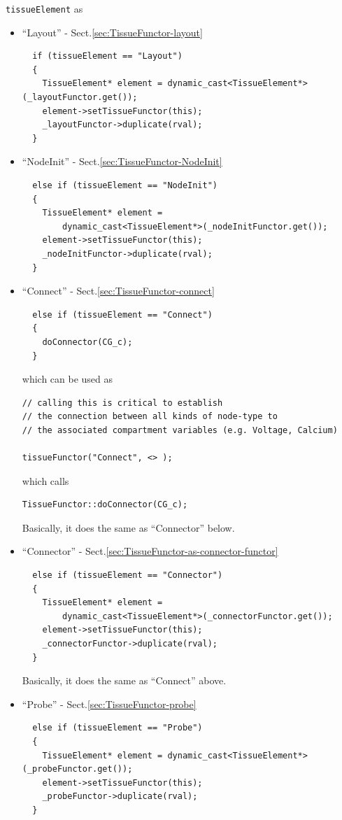 \verb!tissueElement! as
\begin{itemize}
  \item ``Layout'' - Sect.\ref{sec:TissueFunctor-layout}
\begin{verbatim}
  if (tissueElement == "Layout")
  {
    TissueElement* element = dynamic_cast<TissueElement*>(_layoutFunctor.get());
    element->setTissueFunctor(this);
    _layoutFunctor->duplicate(rval);
  }
\end{verbatim}
  \item ``NodeInit'' - Sect.\ref{sec:TissueFunctor-NodeInit}
\begin{verbatim}
  else if (tissueElement == "NodeInit")
  {
    TissueElement* element =
        dynamic_cast<TissueElement*>(_nodeInitFunctor.get());
    element->setTissueFunctor(this);
    _nodeInitFunctor->duplicate(rval);
  }
\end{verbatim}
  \item ``Connect''  - Sect.\ref{sec:TissueFunctor-connect}
\begin{verbatim}
  else if (tissueElement == "Connect")
  {
    doConnector(CG_c);
  }
\end{verbatim}

which can be used as
\begin{verbatim}
// calling this is critical to establish 
// the connection between all kinds of node-type to
// the associated compartment variables (e.g. Voltage, Calcium)

tissueFunctor("Connect", <> ); 
\end{verbatim}
which calls
\begin{verbatim}
TissueFunctor::doConnector(CG_c);
\end{verbatim}



Basically, it does the same as ``Connector'' below.

  \item ``Connector'' - Sect.\ref{sec:TissueFunctor-as-connector-functor}
  
\begin{verbatim}
  else if (tissueElement == "Connector")
  {
    TissueElement* element =
        dynamic_cast<TissueElement*>(_connectorFunctor.get());
    element->setTissueFunctor(this);
    _connectorFunctor->duplicate(rval);
  }
\end{verbatim}
Basically, it does the same as ``Connect'' above.

  \item ``Probe'' - Sect.\ref{sec:TissueFunctor-probe}

\begin{verbatim}
  else if (tissueElement == "Probe")
  {
    TissueElement* element = dynamic_cast<TissueElement*>(_probeFunctor.get());
    element->setTissueFunctor(this);
    _probeFunctor->duplicate(rval);
  }
\end{verbatim}
\end{itemize}

